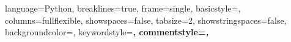  {
  language=Python,
  breaklines=true,
  frame=single,
  basicstyle=\footnotesize\ttfamily,
  columns=fullflexible,
  showspaces=false,
   tabsize=2,               
  showstringspaces=false,  
  backgroundcolor={\color{BlanchedAlmond}},
  keywordstyle=\bfseries\color{blue},
  commentstyle=\itshape\color{DarkViolet},  
}